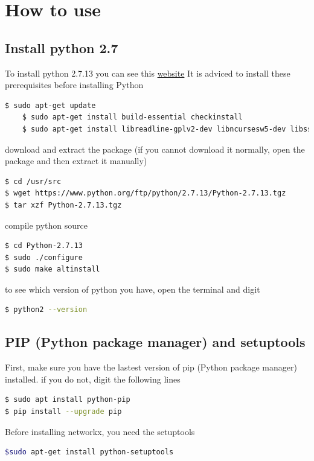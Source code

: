 \section{How to use}
\subsection{Install python 2.7}
To install python 2.7.13 you can see this  \href{https://tecadmin.net/install-python-2-7-on-ubuntu-and-linuxmint/#}{website}
It is adviced to install these prerequisites before installing Python
\begin{lstlisting}[language=bash]
	$ sudo apt-get update
	$ sudo apt-get install build-essential checkinstall
	$ sudo apt-get install libreadline-gplv2-dev libncursesw5-dev libssl-dev libsqlite3-dev tk-dev libgdbm-dev libc6-dev libbz2-dev
\end{lstlisting}


download and extract the package (if you cannot download it normally, open the package and then extract it manually)
\begin{lstlisting}[language=bash]
$ cd /usr/src
$ wget https://www.python.org/ftp/python/2.7.13/Python-2.7.13.tgz
$ tar xzf Python-2.7.13.tgz
\end{lstlisting}



compile python source
\begin{lstlisting}[language=bash]
$ cd Python-2.7.13
$ sudo ./configure
$ sudo make altinstall
\end{lstlisting}

to see which version of python you have, open the terminal and digit\\
\begin{lstlisting}[language=bash]
$ python2 --version
\end{lstlisting}


\subsection{PIP (Python package manager) and setuptools}
First, make sure you have the lastest version of pip (Python package manager) installed.
if you do not, digit the following lines\\
\begin{lstlisting}[language=bash]
$ sudo apt install python-pip
$ pip install --upgrade pip
\end{lstlisting}

Before installing networkx, you need the setuptools\\
\begin{lstlisting}[language=bash]
$sudo apt-get install python-setuptools
\end{lstlisting}

